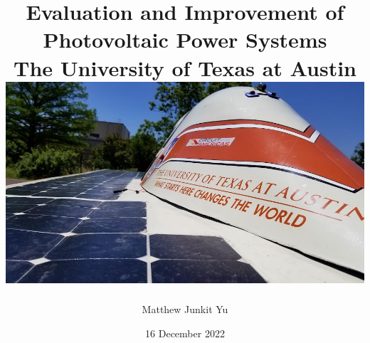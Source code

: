 \documentclass[12pt]{report}
\begin{document}
\title {
    {Evaluation and Improvement of Photovoltaic Power Systems}\\
    {\large The University of Texas at Austin}\\
    {\includegraphics[width=\textwidth]{lonestar_cover.jpg}}
}
\author{Matthew Junkit Yu}
\date{16 December 2022}
\maketitle

\tableofcontents
\listoffigures
\listoftables








\printbibliography
\listoftodos[TODOS]
\end{document}
